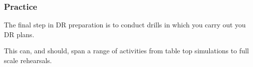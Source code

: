 \documentclass[10pt]{beamer}
\begin{document}
\begin{frame}
  \frametitle{Practice}


 The final step in DR preparation is to conduct drills in which you carry out
 you DR plans.

 This can, and should, span a range of activities from table top simulations to
 full scale rehearsals.
\end{frame}
\end{document}

